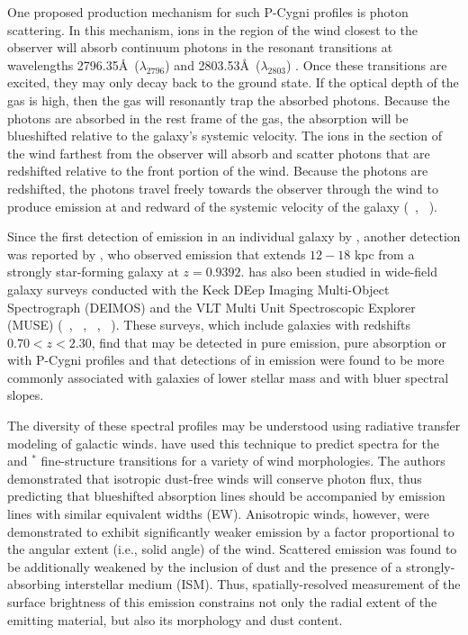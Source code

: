 \documentclass[twocolumn]{aastex62}
\newcommand{\citethnop}[1]{\citeauthor{#1}\ \citeyear{#1}}
\begin{document}
One proposed production mechanism for such P-Cygni profiles is photon scattering. In this mechanism,  ions in the region of the wind closest to the observer will absorb continuum photons in the resonant transitions at wavelengths 2796.35\AA\ ($\lambda_{2796}$) and 2803.53\AA\ ($\lambda_{2803}$) \citep{Morton2003}. Once these transitions are excited, they may only decay back to the ground state. If the optical depth of the gas is high, then the gas will resonantly trap the absorbed photons. Because the photons are absorbed in the rest frame of the gas, the absorption will be blueshifted relative to the galaxy's systemic velocity. The  ions in the section of the wind farthest from the observer will absorb and scatter photons that are redshifted relative to the front portion of the wind. Because the photons are redshifted, the photons travel freely towards the observer through the wind to produce emission at and redward of the systemic velocity of the galaxy (\citethnop{Rubin_2011}, \citethnop{Prochaska_2011}). 

Since the first detection of  emission in an individual galaxy by \citet{Rubin_2011}, another detection was reported by \cite{Martin2013}, who observed  emission that extends $12-18$ kpc from a strongly star-forming galaxy
at $z=0.9392$.  has also been studied in wide-field galaxy surveys conducted with the Keck DEep Imaging Multi-Object Spectrograph (DEIMOS) and the VLT Multi Unit Spectroscopic Explorer (MUSE)  (\citethnop{Weiner2009}, \citethnop{Kornei2013}, \citethnop{Erb2012}, \citethnop{Feltre2018}). These surveys, which include galaxies with redshifts $ 0.70 < z < 2.30$, find that  may be detected in pure emission, pure absorption or with P-Cygni profiles and that detections of  in emission were found to be more commonly associated with galaxies of lower stellar mass and with bluer spectral slopes.

The diversity of these spectral profiles may be understood using radiative transfer modeling of galactic winds. \citet{Prochaska_2011} have used this technique to predict 
spectra for the   and  $^*$ fine-structure transitions for a variety of wind morphologies. The authors demonstrated that isotropic dust-free winds will conserve photon flux, thus predicting that blueshifted absorption lines should be accompanied by emission lines with similar equivalent widths (EW). Anisotropic winds, however, were demonstrated to exhibit significantly weaker emission by a factor proportional to the angular extent (i.e., solid angle) of the wind. Scattered emission was found to be additionally weakened by the inclusion of dust and the presence of a strongly-absorbing interstellar medium (ISM). Thus, spatially-resolved measurement of the surface brightness of this emission constrains not only the radial extent of the emitting material, but also its morphology and dust content.
\end{document}
